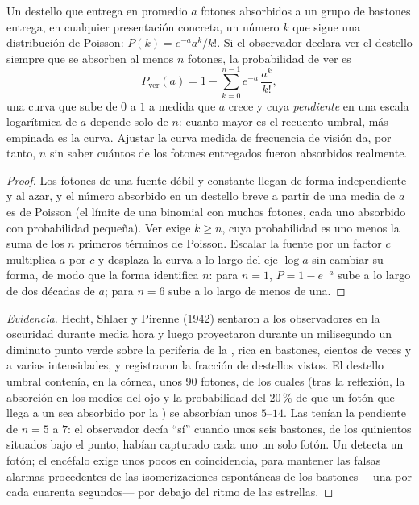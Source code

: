 \begin{theorem}\label{thm:b3:sensory-systems:hecht}
Un destello que entrega en promedio $a$ fotones absorbidos a un grupo
de bastones entrega, en cualquier presentación concreta, un número $k$
que sigue una distribución de Poisson: $P(k) = e^{-a}a^{k}/k!$. Si el
observador declara ver el destello siempre que se absorben al menos $n$
fotones, la probabilidad de ver es
\[
P_{\text{ver}}(a) = 1 - \sum_{k=0}^{n-1} e^{-a}\,\frac{a^{k}}{k!} ,
\]
una curva que sube de $0$ a $1$ a medida que $a$ crece y cuya
\emph{pendiente} en una escala logarítmica de $a$ depende solo de $n$:
cuanto mayor es el recuento umbral, más empinada es la curva. Ajustar
la curva medida de frecuencia de visión da, por tanto, $n$ sin saber
cuántos de los fotones entregados fueron absorbidos realmente.
\end{theorem}
\begin{proof}
Los fotones de una fuente débil y constante llegan de forma
independiente y al azar, y el número absorbido en un destello breve a
partir de una media de $a$ es de Poisson (el límite de una binomial con
muchos fotones, cada uno absorbido con probabilidad pequeña). Ver exige
$k \ge n$, cuya probabilidad es uno menos la suma de los $n$ primeros
términos de Poisson. Escalar la fuente por un factor $c$ multiplica $a$
por $c$ y desplaza la curva a lo largo del eje $\log a$ sin cambiar su
forma, de modo que la forma identifica $n$: para $n =
1$, $P = 1 - e^{-a}$ sube a lo largo de dos décadas de $a$; para $n = 6$
sube a lo largo de menos de una.
\end{proof}

\begin{proof}[Evidencia]
Hecht, Shlaer y Pirenne (1942) sentaron a los observadores en la
oscuridad durante media hora y luego proyectaron durante un
milisegundo un diminuto punto verde sobre la periferia de la ,
rica en bastones, cientos de veces y a varias intensidades, y
registraron la fracción de destellos vistos. El destello umbral
contenía, en la córnea, unos $90$ fotones, de los cuales (tras la
reflexión, la absorción en los medios del ojo y la probabilidad del
$20\,\%$ de que un fotón que llega a un  sea absorbido por la
) se absorbían unos $5$--$14$. Las  tenían la pendiente de $n = 5$ a $7$: el observador decía
``sí'' cuando unos seis bastones, de los quinientos situados bajo el
punto, habían capturado cada uno un solo fotón. Un  detecta un
fotón; el encéfalo exige unos pocos en coincidencia, para mantener las
falsas alarmas procedentes de las isomerizaciones espontáneas de los
bastones ---una por  cada cuarenta segundos--- por debajo del
ritmo de las estrellas.
\end{proof}

